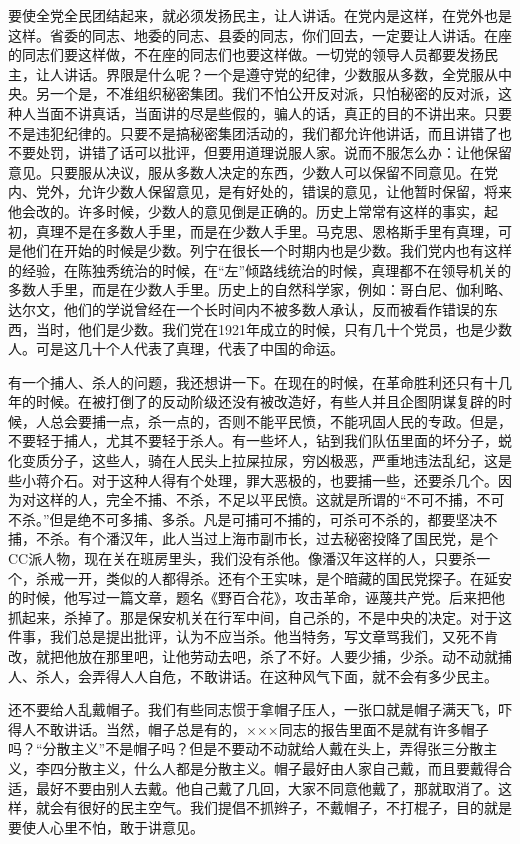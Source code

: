 要使全党全民团结起来，就必须发扬民主，让人讲话。在党内是这样，在党外也是这样。省委的同志、地委的同志、县委的同志，你们回去，一定要让人讲话。在座的同志们要这样做，不在座的同志们也要这样做。一切党的领导人员都要发扬民主，让人讲话。界限是什么呢？一个是遵守党的纪律，少数服从多数，全党服从中央。另一个是，不准组织秘密集团。我们不怕公开反对派，只怕秘密的反对派，这种人当面不讲真话，当面讲的尽是些假的，骗人的话，真正的目的不讲出来。只要不是违犯纪律的。只要不是搞秘密集团活动的，我们都允许他讲话，而且讲错了也不要处罚，讲错了话可以批评，但要用道理说服人家。说而不服怎么办：让他保留意见。只要服从决议，服从多数人决定的东西，少数人可以保留不同意见。在党内、党外，允许少数人保留意见，是有好处的，错误的意见，让他暂时保留，将来他会改的。许多时候，少数人的意见倒是正确的。历史上常常有这样的事实，起初，真理不是在多数人手里，而是在少数人手里。马克思、恩格斯手里有真理，可是他们在开始的时候是少数。列宁在很长一个时期内也是少数。我们党内也有这样的经验，在陈独秀统治的时候，在“左”倾路线统治的时候，真理都不在领导机关的多数人手里，而是在少数人手里。历史上的自然科学家，例如：哥白尼、伽利略、达尔文，他们的学说曾经在一个长时间内不被多数人承认，反而被看作错误的东西，当时，他们是少数。我们党在1921年成立的时候，只有几十个党员，也是少数人。可是这几十个人代表了真理，代表了中国的命运。

有一个捕人、杀人的问题，我还想讲一下。在现在的时候，在革命胜利还只有十几年的时候。在被打倒了的反动阶级还没有被改造好，有些人并且企图阴谋复辟的时候，人总会要捕一点，杀一点的，否则不能平民愤，不能巩固人民的专政。但是，不要轻于捕人，尤其不要轻于杀人。有一些坏人，钻到我们队伍里面的坏分子，蜕化变质分子，这些人，骑在人民头上拉屎拉尿，穷凶极恶，严重地违法乱纪，这是些小蒋介石。对于这种人得有个处理，罪大恶极的，也要捕一些，还要杀几个。因为对这样的人，完全不捕、不杀，不足以平民愤。这就是所谓的“不可不捕，不可不杀。”但是绝不可多捕、多杀。凡是可捕可不捕的，可杀可不杀的，都要坚决不捕，不杀。有个潘汉年，此人当过上海市副市长，过去秘密投降了国民党，是个CC派人物，现在关在班房里头，我们没有杀他。像潘汉年这样的人，只要杀一个，杀戒一开，类似的人都得杀。还有个王实味，是个暗藏的国民党探子。在延安的时候，他写过一篇文章，题名《野百合花》，攻击革命，诬蔑共产党。后来把他抓起来，杀掉了。那是保安机关在行军中间，自己杀的，不是中央的决定。对于这件事，我们总是提出批评，认为不应当杀。他当特务，写文章骂我们，又死不肯改，就把他放在那里吧，让他劳动去吧，杀了不好。人要少捕，少杀。动不动就捕人、杀人，会弄得人人自危，不敢讲话。在这种风气下面，就不会有多少民主。

还不要给人乱戴帽子。我们有些同志惯于拿帽子压人，一张口就是帽子满天飞，吓得人不敢讲话。当然，帽子总是有的，×××同志的报告里面不是就有许多帽子吗？“分散主义”不是帽子吗？但是不要动不动就给人戴在头上，弄得张三分散主义，李四分散主义，什么人都是分散主义。帽子最好由人家自己戴，而且要戴得合适，最好不要由别人去戴。他自己戴了几回，大家不同意他戴了，那就取消了。这样，就会有很好的民主空气。我们提倡不抓辫子，不戴帽子，不打棍子，目的就是要使人心里不怕，敢于讲意见。

